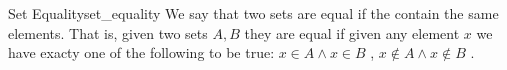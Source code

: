 \begin{definition}{Set Equality}{set_equality}
We say that two sets are equal if the contain the same elements. That is, given
two sets \( A, B \) they are equal if given any element \( x \) we have exacty
one of the following to be true: \( x \in  A \land  x \in  B \) , \( x \not\in A
\land  x \not\in B\) .
\end{definition}
